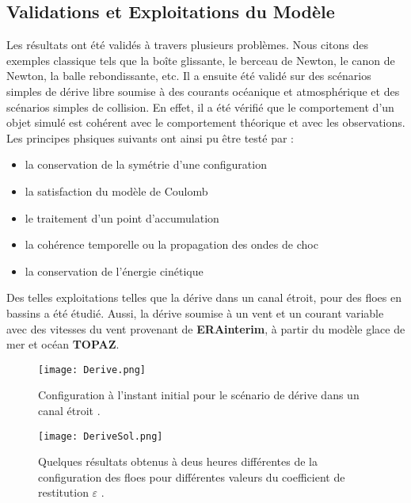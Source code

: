 \subsection{Validations et Exploitations du Modèle}

Les résultats ont été validés à travers plusieurs problèmes. Nous citons des exemples classique tels que la boîte glissante, le berceau de Newton, le canon de Newton, la balle rebondissante, etc. Il a ensuite été validé sur des scénarios simples de dérive libre soumise à des courants océanique et atmosphérique et des scénarios simples de collision. En effet, il a été vérifié que le comportement d’un objet simulé est cohérent avec le comportement théorique et avec les observations. Les principes phsiques suivants ont ainsi pu être testé par \citeauthor{rabatel2015thesis}:
\begin{itemize}
    \item la conservation de la symétrie d’une configuration
    \item la satisfaction du modèle de Coulomb
    \item le traitement d’un point d’accumulation
    \item la cohérence temporelle ou la propagation des ondes de choc
    \item la conservation de l’énergie cinétique
\end{itemize} 
Des telles exploitations telles que la dérive dans un canal étroit, pour des floes en bassins a été étudié. Aussi, la dérive soumise à un vent et un courant variable avec des vitesses du vent provenant de \textbf{ERAinterim}, à partir du modèle glace de mer et océan \textbf{TOPAZ}.

\begin{figure}[!h]
    \centering
    \texttt{[image: Derive.png]}
    \caption{Configuration à l’instant initial pour le scénario de dérive dans un canal étroit \parencite[p.124]{rabatel2015thesis}.}
    \label{fig:Derive}
\end{figure}

\begin{figure}[!h]
    \centering
    \texttt{[image: DeriveSol.png]}
    \caption{Quelques résultats obtenus à deus heures différentes de la configuration des floes pour différentes valeurs du coefficient de restitution $\varepsilon$ \parencite[p.126]{rabatel2015thesis}.}
    \label{fig:DeriveSol}
\end{figure}


